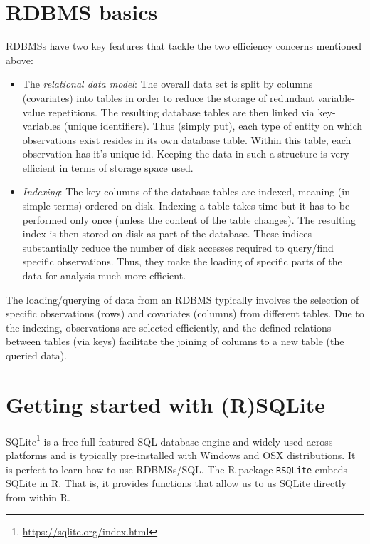 \documentclass[
  12pt,
]{style/krantz}
\renewcommand{\href}[2]{#2\footnote{\url{#1}}}
\begin{document}
\hypertarget{rdbms-basics}{%
\section{RDBMS basics}\label{rdbms-basics}}

RDBMSs have two key features that tackle the two efficiency concerns mentioned above:

\begin{itemize}
\item
  The \emph{relational data model}: The overall data set is split by columns (covariates) into tables in order to reduce the storage of redundant variable-value repetitions. The resulting database tables are then linked via key-variables (unique identifiers). Thus (simply put), each type of entity on which observations exist resides in its own database table. Within this table, each observation has it's unique id. Keeping the data in such a structure is very efficient in terms of storage space used.
\item
  \emph{Indexing}: The key-columns of the database tables are indexed, meaning (in simple terms) ordered on disk. Indexing a table takes time but it has to be performed only once (unless the content of the table changes). The resulting index is then stored on disk as part of the database. These indices substantially reduce the number of disk accesses required to query/find specific observations. Thus, they make the loading of specific parts of the data for analysis much more efficient.
\end{itemize}

The loading/querying of data from an RDBMS typically involves the selection of specific observations (rows) and covariates (columns) from different tables. Due to the indexing, observations are selected efficiently, and the defined relations between tables (via keys) facilitate the joining of columns to a new table (the queried data).

\hypertarget{getting-started-with-rsqlite}{%
\section{Getting started with (R)SQLite}\label{getting-started-with-rsqlite}}

\href{https://sqlite.org/index.html}{SQLite} is a free full-featured SQL database engine and widely used across platforms and is typically pre-installed with Windows and OSX distributions. It is perfect to learn how to use RDBMSs/SQL. The R-package \texttt{RSQLite} embeds SQLite in R. That is, it provides functions that allow us to us SQLite directly from within R.
\end{document}
